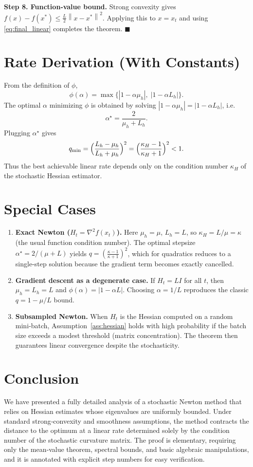 \documentclass{article}
\newcommand{\norm}[1]{\left\|#1\right\|}
\begin{document}
\noindent\textbf{Step 8. Function‑value bound.}  
Strong convexity gives $f(x)-f(x^{*})\le \frac{L}{2}\norm{x-x^{*}}^{2}$. Applying this to $x=x_{t}$ and using \eqref{eq:final_linear} completes the theorem. \hfill $\blacksquare$

\section*{Rate Derivation (With Constants)}
From the definition of $\phi$,
\[
\phi(\alpha)=\max\bigl\{|1-\alpha\mu_{h}|,\;|1-\alpha L_{h}|\bigr\}.
\]
The optimal $\alpha$ minimizing $\phi$ is obtained by solving $|1-\alpha\mu_{h}|=|1-\alpha L_{h}|$, i.e.
\[
\alpha^{\star}=\frac{2}{\mu_{h}+L_{h}}.
\]
Plugging $\alpha^{\star}$ gives
\[
q_{\min}= \Bigl(\frac{L_{h}-\mu_{h}}{L_{h}+\mu_{h}}\Bigr)^{2}
= \Bigl(\frac{\kappa_{H}-1}{\kappa_{H}+1}\Bigr)^{2}<1.
\]
Thus the best achievable linear rate depends only on the condition number $\kappa_{H}$ of the stochastic Hessian estimator.

\section*{Special Cases}
\begin{enumerate}
\item \textbf{Exact Newton ($H_{t}=\nabla^{2}f(x_{t})$).}  
Here $\mu_{h}=\mu$, $L_{h}=L$, so $\kappa_{H}=L/\mu=\kappa$ (the usual function condition number). The optimal stepsize $\alpha^{\star}=2/(\mu+L)$ yields $q=(\frac{\kappa-1}{\kappa+1})^{2}$, which for quadratics reduces to a single‑step solution because the gradient term becomes exactly cancelled.
\item \textbf{Gradient descent as a degenerate case.}  
If $H_{t}=L I$ for all $t$, then $\mu_{h}=L_{h}=L$ and $\phi(\alpha)=|1-\alpha L|$. Choosing $\alpha=1/L$ reproduces the classic $q=1- \mu/L$ bound.
\item \textbf{Subsampled Newton.}  
When $H_{t}$ is the Hessian computed on a random mini‑batch, Assumption~\ref{ass:hessian} holds with high probability if the batch size exceeds a modest threshold (matrix concentration). The theorem then guarantees linear convergence despite the stochasticity.
\end{enumerate}

\section*{Conclusion}
We have presented a fully detailed analysis of a stochastic Newton method that relies on Hessian estimates whose eigenvalues are uniformly bounded. Under standard strong‑convexity and smoothness assumptions, the method contracts the distance to the optimum at a linear rate determined solely by the condition number of the stochastic curvature matrix. The proof is elementary, requiring only the mean‑value theorem, spectral bounds, and basic algebraic manipulations, and it is annotated with explicit step numbers for easy verification.
\end{document}
